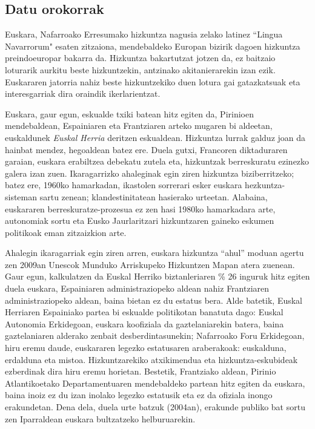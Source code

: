 \begin{multicols}{2}

\subsection{Datu orokorrak}

    Euskara, Nafarroako Erresumako hizkuntza nagusia zelako latinez “Lingua Navarrorum" esaten zitzaiona, mendebaldeko Europan bizirik dagoen hizkuntza preindoeuropar bakarra da. Hizkuntza bakartutzat jotzen da, ez baitzaio loturarik aurkitu beste hizkuntzekin, antzinako akitanierarekin izan ezik. Euskararen jatorria nahiz beste hizkuntzekiko duen lotura gai gatazkatsuak eta interesgarriak dira oraindik ikerlarientzat.


Euskara, gaur egun, eskualde txiki batean hitz egiten da, Pirinioen mendebaldean, Espainiaren eta Frantziaren arteko mugaren bi aldeetan, euskaldunek \textit{Euskal Herria} deritzen eskualdean. Hizkuntza lurrak galduz joan da hainbat mendez, hegoaldean batez ere. Duela gutxi, Francoren diktaduraren garaian, euskara erabiltzea debekatu zutela eta, hizkuntzak berreskuratu ezinezko galera izan zuen. Ikaragarrizko ahaleginak egin ziren hizkuntza biziberritzeko; batez ere, 1960ko hamarkadan, ikastolen sorrerari esker euskara hezkuntza-sisteman sartu zenean; klandestinitatean hasierako urteetan. Alabaina, euskararen berreskuratze-prozesua ez zen hasi 1980ko hamarkadara arte, autonomiak sortu eta Eusko Jaurlaritzari hizkuntzaren gaineko eskumen politikoak eman zitzaizkion arte. 

Ahalegin ikaragarriak egin ziren arren, euskara hizkuntza “ahul” moduan agertu zen 2009an Unescok Munduko Arriskupeko Hizkuntzen Mapan \cite{BAS-Nota5}  atera zuenean. Gaur egun, kalkulatzen da Euskal Herriko biztanleriaren \cite{BAS-Nota6}   \% 26 inguruk hitz egiten duela euskara, Espainiaren administraziopeko aldean nahiz Frantziaren administraziopeko aldean, baina bietan ez du estatus bera. Alde batetik, Euskal Herriaren Espainiako partea bi eskualde politikotan banatuta dago: Euskal Autonomia Erkidegoan, euskara koofiziala da gaztelaniarekin batera, baina gaztelaniaren alderako zenbait desberdintasunekin; Nafarroako Foru Erkidegoan, hiru eremu daude, euskararen legezko estatusaren araberakoak: euskalduna, erdalduna eta mistoa. Hizkuntzarekiko atxikimendua eta hizkuntza-eskubideak ezberdinak dira hiru eremu horietan. Bestetik, Frantziako aldean, Pirinio Atlantikoetako Departamentuaren mendebaldeko partean hitz egiten da euskara, baina inoiz ez du izan inolako legezko estatusik eta ez da ofiziala inongo erakundetan. Dena dela, duela urte batzuk (2004an), erakunde publiko bat sortu zen Iparraldean euskara bultzatzeko helburuarekin.


\end{multicols}
